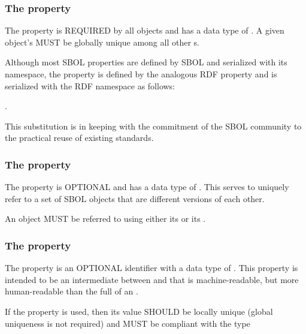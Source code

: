 \subsubsection*{The  property}
\label{sec:identity}
The  property is REQUIRED by all  objects and has a data type of . A given  object's   MUST be globally unique among all other  s. 

Although most SBOL properties are defined by SBOL and serialized with its namespace, the  property is defined by the analogous RDF  property and is serialized with the RDF namespace as follows:

.

This substitution is in keeping with the commitment of the SBOL community to the practical reuse of existing standards.

\subsubsection*{The  property}
\label{sec:persistentIdentity}
The  property is OPTIONAL and has a data type of . This  serves to uniquely refer to a set of SBOL objects that are different versions of each other. 

An  object MUST be referred to using either its   or its  .

\subsubsection*{The  property}
\label{sec:displayId}
The  property is an OPTIONAL identifier with a data type of . This property is intended to be an intermediate between  and  that is machine-readable, but more human-readable than the full  of an . 

If the  property is used, then its  value SHOULD be locally unique (global uniqueness is not required) and MUST be compliant with the type 


